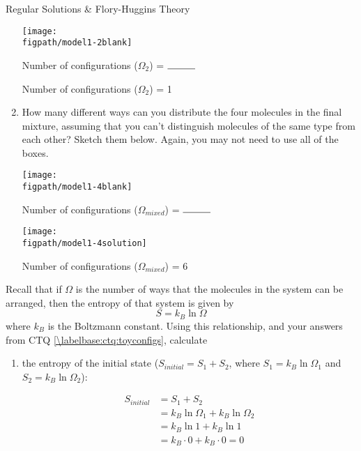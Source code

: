 \begin{activity}{Regular Solutions \& Flory-Huggins Theory}
\begin{ctqs}
\begin{enumerate}
\begin{solution}[1in]{

\centerline{\texttt{[image: \\figpath/model1-2blank]}}

						\vspace{0.1in}
						\centerline{Number of configurations ($\Omega_2$) = $\rule{1cm}{0.15mm}$}
					}
						\vspace{0.1in}
						\centerline{Number of configurations ($\Omega_2$) = 1}
					
				\end{solution}
			
			\item How many different ways can you distribute the four molecules in the final mixture, assuming that you can't distinguish molecules of the same type from each other?  Sketch them below.  Again, you may not need to use all of the boxes.
			
				\begin{solution}[1.5in]{

\centerline{\texttt{[image: \\figpath/model1-4blank]}}

						\vspace{0.1in}
						\centerline{Number of configurations ($\Omega_{mixed}$) = $\rule{1cm}{0.15mm}$}
					}

\centerline{\texttt{[image: \\figpath/model1-4solution]}}

						\vspace{0.1in}
						\centerline{Number of configurations ($\Omega_{mixed}$) = 6}
					
				\end{solution}
		\end{enumerate}
		
	\question Recall that if $\Omega$ is the number of ways that the molecules in the system can be arranged, then the entropy of that system is given by
		\begin{equation*}
			S = k_B \ln \Omega
		\end{equation*} 
		where $k_B$ is the Boltzmann constant.  Using this relationship, and your answers from CTQ \ref{\labelbase:ctq:toyconfigs}, calculate
			
		\begin{enumerate}
			\item the entropy of the initial state ($S_{initial} = S_1 + S_2$, where $S_1 = k_B\ln \Omega_1$ and $S_2 = k_B \ln \Omega_2$):
			
				\begin{solution}[1in]{}
					\begin{align*}
						S_{initial} &= S_1 + S_2 \\
							&= k_B\ln\Omega_1 + k_B\ln\Omega_2\\
							&= k_B \ln 1 + k_B \ln 1 \\
							&= k_B\cdot 0 + k_B\cdot 0 = 0
					\end{align*}
				\end{solution}
				

\end{enumerate}
\end{ctqs}
\end{activity}
